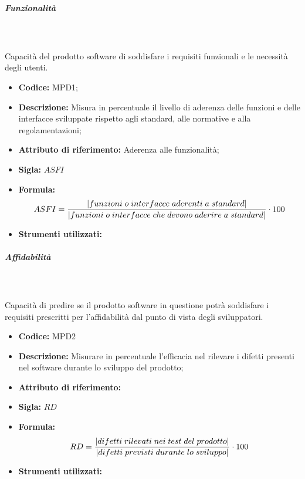 \subparagraph{Funzionalità}\mbox{}\\ \\
Capacità del prodotto software di soddisfare i requisiti funzionali e le necessità degli utenti.
\begin{itemize}
    \item \textbf{Codice:} MPD1;
    \item \textbf{Descrizione:} Misura in percentuale il livello di aderenza delle funzioni e delle interfacce sviluppate rispetto agli standard, alle normative e alla regolamentazioni;
    \item \textbf{Attributo di riferimento:} Aderenza alle funzionalità;
    \item \textbf{Sigla:} $ASFI$ 
    \item \textbf{Formula:} $$ASFI = {|funzioni \; o \; interfacce \; aderenti \; a \; standard| \over |funzioni \; o \; interfacce \; che \; devono \; aderire \; a \; standard|} \cdot 100 $$ 
    \item \textbf{Strumenti utilizzati:}
\end{itemize}
              
\subparagraph{Affidabilità} \mbox{}\\ \\
Capacità di predire se il prodotto software in questione potrà soddisfare i requisiti prescritti per l'affidabilità dal punto di vista degli sviluppatori.

\begin{itemize}
    \item \textbf{Codice:} MPD2
    \item \textbf{Descrizione:} Misurare in percentuale l'efficacia nel rilevare i difetti presenti nel software durante lo sviluppo del prodotto;
    \item \textbf{Attributo di riferimento:} 
    \item \textbf{Sigla:} $RD$
    \item \textbf{Formula:} $$RD = {|difetti \; rilevati \; nei \; test \; del \; prodotto| \over |difetti \; previsti \; durante \; lo \; sviluppo|} \cdot 100 $$
    \item \textbf{Strumenti utilizzati:}
\end{itemize}

